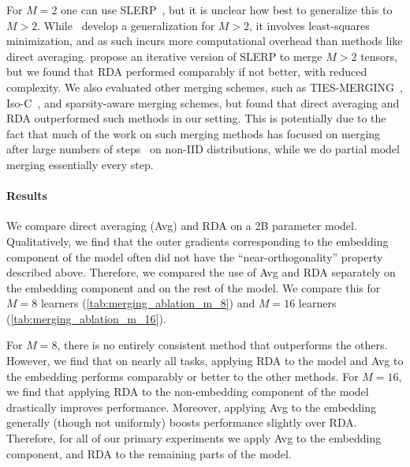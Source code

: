 \documentclass[11pt, a4paper, twocolumn, copyright, google]{google}
\begin{document}
For $M = 2$ one can use SLERP~\citep{shoemake1985animating}, but it is unclear how best to generalize this to $M > 2$. While~\citep{buss2001spherical} develop a generalization for $M > 2$, it involves least-squares minimization, and as such incurs more computational overhead than methods like direct averaging. \citet{rame2024warpbenefitsweightaveraged} propose an iterative version of SLERP to merge $M > 2$ tensors, but we found that RDA performed comparably if not better, with reduced complexity. We also evaluated other merging schemes, such as TIES-MERGING~\citep{yadav2023ties}, Iso-C~\citep{marczak2025taskleftbehindisotropic}, and sparsity-aware merging schemes, but found that direct averaging and RDA outperformed such methods in our setting. This is potentially due to the fact that much of the work on such merging methods has focused on merging after large numbers of steps~\citep{wortsman2022modelsoupsaveragingweights} on non-IID distributions, while we do partial model merging essentially every step.

\paragraph{Results}

We compare direct averaging (Avg) and RDA on a 2B parameter model. Qualitatively, we find that the outer gradients corresponding to the embedding component of the model often did not have the ``near-orthogonality'' property described above. Therefore, we compared the use of Avg and RDA separately on the embedding component and on the rest of the model. We compare this for $M = 8$ learners (\autoref{tab:merging_ablation_m_8}) and $M = 16$ learners (\autoref{tab:merging_ablation_m_16}).

For $M = 8$, there is no entirely consistent method that outperforms the others. However, we find that on nearly all tasks, applying RDA to the model and Avg to the embedding performs comparably or better to the other methods. For $M=16$, we find that applying RDA to the non-embedding component of the model drastically improves performance. Moreover, applying Avg to the embedding generally (though not uniformly) boosts performance slightly over RDA. Therefore, for all of our primary experiments we apply Avg to the embedding component, and RDA to the remaining parts of the model.
\end{document}
